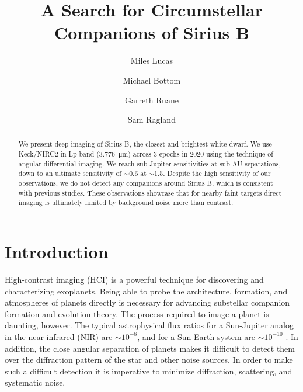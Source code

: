 \documentclass[twocolumn]{aastex631}
\begin{document}
\title{A Search for Circumstellar Companions of Sirius B}



\author[0000-0001-6341-310X]{Miles Lucas}

\author[0000-0003-1341-5531]{Michael Bottom}

\author[0000-0003-4769-1665]{Garreth Ruane}

\author[0000-0002-0696-1780]{Sam Ragland}


\begin{abstract}
We present deep imaging of Sirius B, the closest and brightest white dwarf. We use Keck/NIRC2 in Lp band (\qty{3.776}{\micro\meter}) across 3 epochs in 2020 using the technique of angular differential imaging. We reach sub-Jupiter sensitivities at sub-AU separations, down to an ultimate sensitivity of $\sim$\qty{0.6}{\jupitermass} at $\sim$\qty{1.5}{\au}. Despite the high sensitivity of our observations, we do not detect any companions around Sirius B, which is consistent with previous studies. These observations showcase that for nearby faint targets direct imaging is ultimately limited by background noise more than contrast.
\end{abstract}

\section{Introduction} \label{sec:intro}

High-contrast imaging (HCI) is a powerful technique for discovering and characterizing exoplanets. Being able to probe the architecture, formation, and atmospheres of planets directly is necessary for advancing substellar companion formation and evolution theory. The process required to image a planet is daunting, however. The typical astrophysical flux ratios for a Sun-Jupiter analog in the near-infrared (NIR) are $\sim$$10^{-8}$, and for a Sun-Earth system are $\sim$$10^{-10}$ \citep{traub_direct_2010}. In addition, the close angular separation of planets makes it difficult to detect them over the diffraction pattern of the star and other noise sources. In order to make such a difficult detection it is imperative to minimize diffraction, scattering, and systematic noise.
\end{document}
